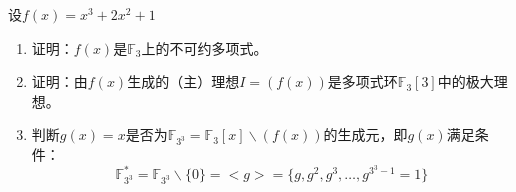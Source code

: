 设$f(x)=x^3+2x^2+1$
\begin{enumerate}
    \item 证明：$f(x)$是$\mathbb{F}_3$上的不可约多项式。
    

    \item 证明：由$f(x)$生成的（主）理想$I=(f(x))$是多项式环$\mathbb{F}_3[3]$中的极大理想。
    

    \item 判断$g(x)=x$是否为$\mathbb{F}_{3^3}=\mathbb{F}_3[x]\backslash(f(x))$的生成元，即$g(x)$满足条件：
    \begin{equation*}
        \mathbb{F}_{3^3}^*=\mathbb{F}_{3^3}\backslash\{0\}=<g>=\{g,g^2,g^3,\dots,g^{3^3-1}=1\}
    \end{equation*}
    
\end{enumerate}